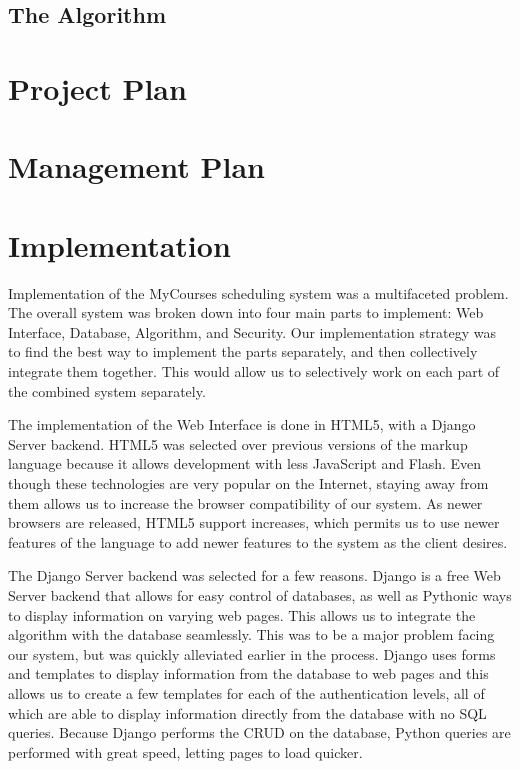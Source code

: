 \documentclass[12pt,article]{memoir}
\begin{document}
\section{The Algorithm}

\chapter{Project Plan} %
\chapter{Management Plan} %
\chapter{Implementation} %

Implementation of the MyCourses scheduling system was a multifaceted problem. The overall system was broken down into four main parts to implement: Web Interface, Database, Algorithm, and Security. Our implementation strategy was to find the best way to implement the parts separately, and then collectively integrate them together. This would allow us to selectively work on each part of the combined system separately.

The implementation of the Web Interface is done in HTML5, with a Django Server backend. HTML5 was selected over previous versions of the markup language because it allows development with less JavaScript and Flash. Even though these technologies are very popular on the Internet, staying away from them allows us to increase the browser compatibility of our system. As newer browsers are released, HTML5 support increases, which permits us to use newer features of the language to add newer features to the system as the client desires. 

The Django Server backend was selected for a few reasons. Django is a free Web Server backend that allows for easy control of databases, as well as Pythonic ways to display information on varying web pages. This allows us to integrate the algorithm with the database seamlessly. This was to be a major problem facing our system, but was quickly alleviated earlier in the process. Django uses forms and templates to display information from the database to web pages and this allows us to create a few templates for each of the authentication levels, all of which are able to display information directly from the database with no SQL queries. Because Django performs the CRUD on the database, Python queries are performed with great speed, letting pages to load quicker.
\end{document}

